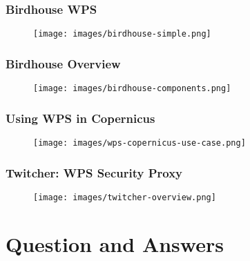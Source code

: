\documentclass{beamer}
\begin{document}

  \begin{frame}[plain]
    \frametitle{Birdhouse WPS}
    \begin{figure}
      \texttt{[image: images/birdhouse-simple.png]}
    \end{figure}
  \end{frame}



  \begin{frame}[plain]
    \frametitle{Birdhouse Overview}
    \begin{figure}
      \texttt{[image: images/birdhouse-components.png]}
    \end{figure}
  \end{frame}


  \begin{frame}[plain]
    \frametitle{Using WPS in Copernicus}
    \begin{figure}
      \texttt{[image: images/wps-copernicus-use-case.png]}
    \end{figure}
  \end{frame}


  \begin{frame}[plain]
    \frametitle{Twitcher: WPS Security Proxy}
    \begin{figure}
      \texttt{[image: images/twitcher-overview.png]}
    \end{figure}
  \end{frame}


  \section{Question and Answers}
\end{document}
